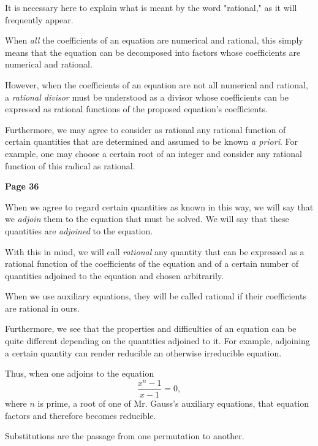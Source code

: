 \documentclass{article}
\begin{document}
It is necessary here to explain what is meant by the word "rational," as it will frequently appear.

When \textit{all} the coefficients of an equation are numerical and rational, this simply means that the equation can be decomposed into factors whose coefficients are numerical and rational.

However, when the coefficients of an equation are not all numerical and rational, a \textit{rational divisor} must be understood as a divisor whose coefficients can be expressed as rational functions of the proposed equation's coefficients.

Furthermore, we may agree to consider as rational any rational function of certain quantities that are determined and assumed to be known \textit{a priori}. For example, one may choose a certain root of an integer and consider any rational function of this radical as rational.

\medskip

\newpage
\centerline{\textbf{Page 36}}

\medskip

When we agree to regard certain quantities as known in this way, we will say that we \emph{adjoin} them to the equation that must be solved. We will say that these quantities are \emph{adjoined} to the equation.

\smallskip

With this in mind, we will call \emph{rational} any quantity that can be expressed as a rational function of the coefficients of the equation and of a certain number of quantities adjoined to the equation and chosen arbitrarily.

\smallskip

When we use auxiliary equations, they will be called rational if their coefficients are rational in ours.

\smallskip

Furthermore, we see that the properties and difficulties of an equation can be quite different depending on the quantities adjoined to it. For example, adjoining a certain quantity can render reducible an otherwise irreducible equation.

\smallskip

Thus, when one adjoins to the equation
\[
\frac{x^n - 1}{x-1} = 0,
\]
where $n$ is prime, a root of one of Mr. Gauss's auxiliary equations, that equation factors and therefore becomes reducible.

\smallskip

Substitutions are the passage from one permutation to another.
\end{document}
